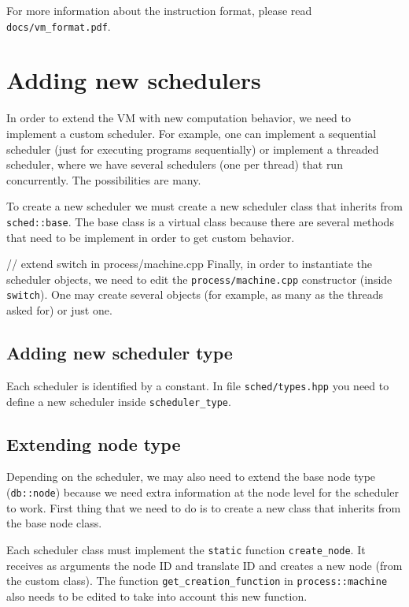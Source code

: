 \documentclass[11pt]{article}
\begin{document}
For more information about the instruction format, please read \texttt{docs/vm\_format.pdf}.

\section{Adding new schedulers}

In order to extend the VM with new computation behavior, we need to implement a custom scheduler. For example, one can implement a sequential scheduler (just for executing programs sequentially) or implement a threaded scheduler, where we have several schedulers (one per thread) that run concurrently. The possibilities are many.

To create a new scheduler we must create a new scheduler class that inherits from \texttt{sched::base}. The base class is a virtual class because there are several methods that need to be implement in order to get custom behavior.

// extend switch in process/machine.cpp
Finally, in order to instantiate the scheduler objects, we need to edit the \texttt{process/machine.cpp} constructor (inside \texttt{switch}). One may create several objects (for example, as many as the threads asked for) or just one.

\subsection{Adding new scheduler type}

Each scheduler is identified by a constant.
In file \texttt{sched/types.hpp} you need to define a new scheduler inside \texttt{scheduler\_type}.

\subsection{Extending node type}

Depending on the scheduler, we may also need to extend the base node type (\texttt{db::node}) because we need extra information at the node level for the scheduler to work. First thing that we need to do is to create a new class that inherits from the base node class.

Each scheduler class must implement the \texttt{static} function \texttt{create\_node}. It receives as arguments the node ID and translate ID and creates a new node (from the custom class). The function \texttt{get\_creation\_function} in \texttt{process::machine} also needs to be edited to take into account this new function.
\end{document}
